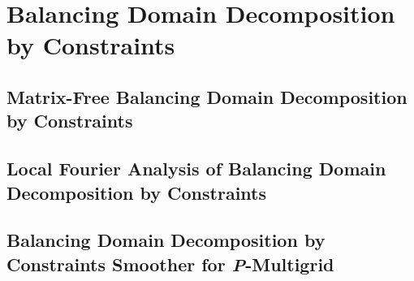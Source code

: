 \chapter{Balancing Domain Decomposition by Constraints}\label{ch:DomainDecomposition}


\section{Matrix-Free Balancing Domain Decomposition by Constraints}\label{sec:matrixfreebddc}


\section{Local Fourier Analysis of Balancing Domain Decomposition by Constraints}\label{sec:lfaofbddc}


\section{Balancing Domain Decomposition by Constraints Smoother for {\textit P}-Multigrid}\label{sec:bddcsmoother}

